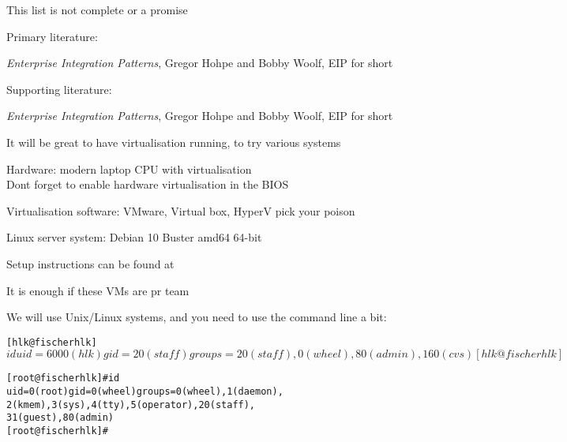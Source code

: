 \documentclass[Screen16to9,17pt]{foils}
\begin{document}
\centerline{This list is not complete or a promise }



Primary literature:
\begin{list2}
\item \emph{Enterprise Integration Patterns}, Gregor Hohpe and Bobby Woolf, EIP for short
\item
\end{list2}
Supporting literature:
\begin{list2}
\item
\end{list2}




\emph{Enterprise Integration Patterns}, Gregor Hohpe and Bobby Woolf, EIP for short





\begin{list2}
\item It will be great to have virtualisation running, to try various systems
\item Hardware: modern laptop CPU with virtualisation\\
Dont forget to enable hardware virtualisation in the BIOS
\item Virtualisation software: VMware, Virtual box, HyperV pick your poison
\item Linux server system: Debian 10 Buster amd64 64-bit
\item Setup instructions can be found at 
\end{list2}

\centerline{It is enough if these VMs are pr team}






We will use Unix/Linux systems, and you need to use the command line a bit:

\begin{alltt}
\small
[hlk@fischer hlk]$ id
uid=6000(hlk) gid=20(staff) groups=20(staff),
0(wheel), 80(admin), 160(cvs)
[hlk@fischer hlk]$

[root@fischer hlk]# id
uid=0(root) gid=0(wheel) groups=0(wheel), 1(daemon),
2(kmem), 3(sys), 4(tty), 5(operator), 20(staff),
31(guest), 80(admin)
[root@fischer hlk]#
\end{alltt}
\end{document}
